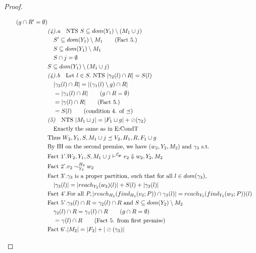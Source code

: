 \documentclass[11pt]{article}
\newcommand{\ms}[1]{\ensuremath{\mathsf{#1}}}
\newcommand{\veq}[4]{#3 \sim^{#1}_{#2} #4}
\newcommand{\oh}[1]{\oslash(#1)}
\newcommand{\gcSem}{\ensuremath{\mathcal{E}_{\ms{gc}}}}
\theoremstyle{definition}
\begin{document}
\begin{proof}
\begin{description}
\begin{align*}
			\tag{$g \cap R' = \emptyset$}\\
		&\emph{(4).a}\quad \text{NTS } S \subseteq dom(Y_1) \setminus (M_1 \cup j)\\
		&\quad S' \subseteq dom(Y_1) \setminus M_1 \tag{Fact 5.}\\
		&\quad S \subseteq dom(Y_1) \setminus M_1\\
		&\quad S \cap j = \emptyset\\
		&S \subseteq dom(Y_1) \setminus (M_1 \cup j)\\
		&\emph{(4).b}\quad \text{Let } l \in S. \text{ NTS } |\gamma_2(l) \cap R| = S(l)\\
		&\quad |\gamma_2(l) \cap R| = |(\gamma_1(l) \setminus g) \cap R| \\
		&\quad = |\gamma_1(l) \cap R| \tag{$g \cap R = \emptyset$}\\
		&\quad = |\gamma(l) \cap R| \tag{Fact 5.}\\
		&\quad = S(l) \tag{condition 4. of $\preceq$}\\ 
		&\emph{(5)}\quad \text{NTS } |M_1 \sqcup j| = |F_1 \sqcup g| + \oh{\gamma_2}\\
		&\quad\text{Exactly the same as in E:CondT}\\
		&\text{Thus } W_2,Y_1,S,M_1 \cup j \preceq V_2,H_1,R, F_1 \cup g\\
		&\text{By IH on the second premise, we have } (w_2,Y_2,M_2) \text{ and } \gamma_3 \text{ s.t. }\\
		&\text{Fact 1'}. W_2,Y_1,S,M_1 \cup j \vdash^{\gcSem} e_2 \Downarrow w_2,Y_2,M_2\\
		&\text{Fact 2'}. \veq{H_2}{Y_2}{v_2}{w_2}\\
		&\text{Fact 3'}. \gamma_3 \text{ is a proper partition, such that for all } l \in dom(\gamma_3),\\
		&\quad|\gamma_3(l)| = |reach_{Y_2}(w_2)(l)| + S(l) + |\gamma_3(l)|\\
		&\text{Fact 4'}. \text{For all } P, |reach_{H_2}(find_{H_2}(v_2;P)) \cap \gamma_3(l)| = 
				reach_{Y_2}(find_{Y_2}(w_2;P))(l)\\
		&\text{Fact 5'}. \gamma_3(l) \cap R = \gamma_2(l) \cap R \text{ and } 
			S \subseteq dom(Y_2) \setminus M_2\\
		&\quad \gamma_2(l) \cap R = \gamma_1(l) \cap R \tag{$g \cap R = \emptyset$}\\
		&\quad = \gamma(l) \cap R \tag{Fact 5. from first premise}\\
		&\text{Fact 6'}. |M_2| = |F_2| + |\oh{\gamma_3}|\\

\end{align*}
\end{description}
\end{proof}
\end{document}
